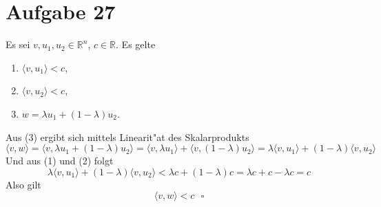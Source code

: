 \section{Aufgabe 27}

Es sei $v, u_1, u_2 \in \mathbb{R}^n$, $c \in \mathbb{R}$. Es gelte
\begin{enumerate}[(1)]
    \item $\langle v, u_1 \rangle < c$,
    \item $\langle v, u_2 \rangle < c$,
    \item $w = \lambda u_1 + (1 - \lambda) u_2$.
\end{enumerate}
Aus (3) ergibt sich mittels Linearit"at des Skalarprodukts
\begin{equation*}
    \langle v, w \rangle = \langle v, \lambda u_1 + (1 - \lambda) u_2 \rangle = \langle v, \lambda u_1 \rangle + \langle v, (1 - \lambda) u_2 \rangle = \lambda \langle v, u_1 \rangle + (1 - \lambda) \langle v, u_2 \rangle
\end{equation*}
Und aus (1) und (2) folgt
\begin{equation*}
    \lambda \langle v, u_1 \rangle + (1 - \lambda) \langle v, u_2 \rangle < \lambda c + (1 - \lambda) c = \lambda c + c - \lambda c = c
\end{equation*}
Also gilt
\begin{equation*}
    \langle v, w \rangle < c \ \ \ \square
\end{equation*}
